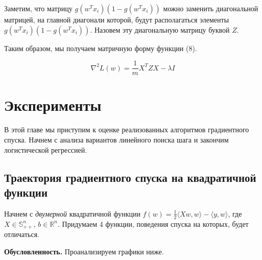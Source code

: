 \documentclass{article}
\begin{document}
	Заметим, что матрицу $g(w^Tx_i) (1 - g(w^Tx_i))$ можно заменить диагональной матрицей, на главной диагонали которой, будут располагаться элементы $g(w^Tx_i) (1 - g(w^Tx_i))$. Назовем эту диагональную матрицу буквой $Z$.
	
	\vspace{0.5cm}
	Таким образом, мы получаем матричную форму функции (8).
	
	\begin{equation}
		\nabla^2 L(w) = \frac{1}{m} X^T Z X - \lambda I
	\end{equation}
	
	\vspace{2cm}
	
	\section{Эксперименты}
	
	В этой главе мы приступим к оценке реализованных алгоритмов градиентного спуска. Начнем с анализа вариантов линейного поиска шага и закончим логистической регрессией. 
	
	\subsection{Траектория градиентного спуска на квадратичной функции}
	
	Начнем с {\it двумерной} квадратичной функции $f(w) = \frac{1}{2} \langle Xw, w \rangle  - \langle y, w \rangle $, где $X \in \mathbb{S}_{++}^n$, $b \in \mathbb{R}^n$. Придумаем 4 функции, поведения спуска на которых, будет отличаться.
	
	\vspace{0.5cm}
	{\bf Обусловленность.} Проанализируем графики ниже.
\end{document}
